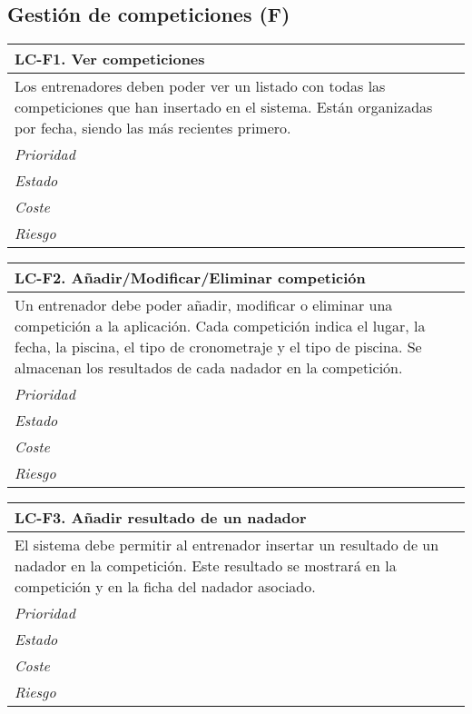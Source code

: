 %
%
\subsection{Gestión de competiciones (F)} %
	\label{sub:gestion_de_competiciones}

	\begin{center}
		\begin{tabularx}{15cm}{|X|}
			\hline 
				\bf{LC-F1. Ver competiciones}\\
			\hline
				Los entrenadores deben poder ver un listado con todas las competiciones que han insertado en el sistema. Están organizadas por fecha, siendo las más recientes primero.\\
			\hline
				\it{Prioridad}\\
			\hline
				\it{Estado}\\
			\hline
				\it{Coste}\\
			\hline
				\it{Riesgo}\\
			\hline
		\end{tabularx}
	\end{center}
	
	\begin{center}
		\begin{tabularx}{15cm}{|X|}
			\hline 
				\bf{LC-F2. Añadir/Modificar/Eliminar competición }\\
			\hline
				Un entrenador debe poder añadir, modificar o eliminar una competición a la aplicación. Cada competición indica el lugar, la fecha, la piscina, el tipo de cronometraje y el tipo de piscina. Se almacenan los resultados de cada nadador en la competición.\\
			\hline
				\it{Prioridad}\\
			\hline
				\it{Estado}\\
			\hline
				\it{Coste}\\
			\hline
				\it{Riesgo}\\
			\hline
		\end{tabularx}
	\end{center}
	
	\begin{center}
		\begin{tabularx}{15cm}{|X|}
			\hline 
				\bf{LC-F3. Añadir resultado de un nadador }\\
			\hline
				El sistema debe permitir al entrenador insertar un resultado de un nadador en la competición. Este resultado se mostrará en la competición y en la ficha del nadador asociado.\\
			\hline
				\it{Prioridad}\\
			\hline
				\it{Estado}\\
			\hline
				\it{Coste}\\
			\hline
				\it{Riesgo}\\
			\hline
		\end{tabularx}
	\end{center}
	
